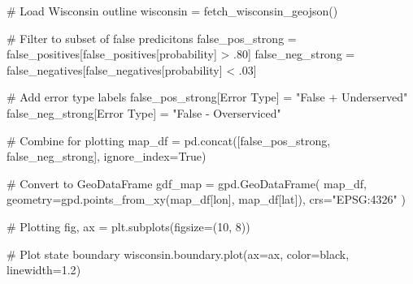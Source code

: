 \documentclass[
]{article}
\newenvironment{Shaded}{\begin{snugshade}}{\end{snugshade}}
\newcommand{\CommentTok}[1]{\textcolor[rgb]{0.37,0.37,0.37}{#1}}
\newcommand{\DecValTok}[1]{\textcolor[rgb]{0.68,0.00,0.00}{#1}}
\newcommand{\FloatTok}[1]{\textcolor[rgb]{0.68,0.00,0.00}{#1}}
\newcommand{\NormalTok}[1]{\textcolor[rgb]{0.00,0.23,0.31}{#1}}
\newcommand{\OperatorTok}[1]{\textcolor[rgb]{0.37,0.37,0.37}{#1}}
\newcommand{\StringTok}[1]{\textcolor[rgb]{0.13,0.47,0.30}{#1}}
\newcommand{\VariableTok}[1]{\textcolor[rgb]{0.07,0.07,0.07}{#1}}
\begin{document}
\begin{Shaded}
\begin{Highlighting}[]
\CommentTok{\# Load Wisconsin outline}
\NormalTok{wisconsin }\OperatorTok{=}\NormalTok{ fetch\_wisconsin\_geojson()}

\CommentTok{\# Filter to subset of false predicitons}
\NormalTok{false\_pos\_strong }\OperatorTok{=}\NormalTok{ false\_positives[false\_positives[}\StringTok{\textquotesingle{}probability\textquotesingle{}}\NormalTok{] }\OperatorTok{\textgreater{}} \FloatTok{.80}\NormalTok{]}
\NormalTok{false\_neg\_strong }\OperatorTok{=}\NormalTok{ false\_negatives[false\_negatives[}\StringTok{\textquotesingle{}probability\textquotesingle{}}\NormalTok{] }\OperatorTok{\textless{}} \FloatTok{.03}\NormalTok{]}

\CommentTok{\# Add error type labels}
\NormalTok{false\_pos\_strong[}\StringTok{\textquotesingle{}Error Type\textquotesingle{}}\NormalTok{] }\OperatorTok{=} \StringTok{"False + Underserved"}
\NormalTok{false\_neg\_strong[}\StringTok{\textquotesingle{}Error Type\textquotesingle{}}\NormalTok{] }\OperatorTok{=} \StringTok{"False {-} Overserviced"}

\CommentTok{\# Combine for plotting}
\NormalTok{map\_df }\OperatorTok{=}\NormalTok{ pd.concat([false\_pos\_strong, false\_neg\_strong], ignore\_index}\OperatorTok{=}\VariableTok{True}\NormalTok{)}

\CommentTok{\# Convert to GeoDataFrame}
\NormalTok{gdf\_map }\OperatorTok{=}\NormalTok{ gpd.GeoDataFrame(}
\NormalTok{    map\_df,}
\NormalTok{    geometry}\OperatorTok{=}\NormalTok{gpd.points\_from\_xy(map\_df[}\StringTok{\textquotesingle{}lon\textquotesingle{}}\NormalTok{], map\_df[}\StringTok{\textquotesingle{}lat\textquotesingle{}}\NormalTok{]),}
\NormalTok{    crs}\OperatorTok{=}\StringTok{"EPSG:4326"}
\NormalTok{)}

\CommentTok{\# Plotting}
\NormalTok{fig, ax }\OperatorTok{=}\NormalTok{ plt.subplots(figsize}\OperatorTok{=}\NormalTok{(}\DecValTok{10}\NormalTok{, }\DecValTok{8}\NormalTok{))}

\CommentTok{\# Plot state boundary}
\NormalTok{wisconsin.boundary.plot(ax}\OperatorTok{=}\NormalTok{ax, color}\OperatorTok{=}\StringTok{\textquotesingle{}black\textquotesingle{}}\NormalTok{, linewidth}\OperatorTok{=}\FloatTok{1.2}\NormalTok{)}


\end{Highlighting}
\end{Shaded}
\end{document}
